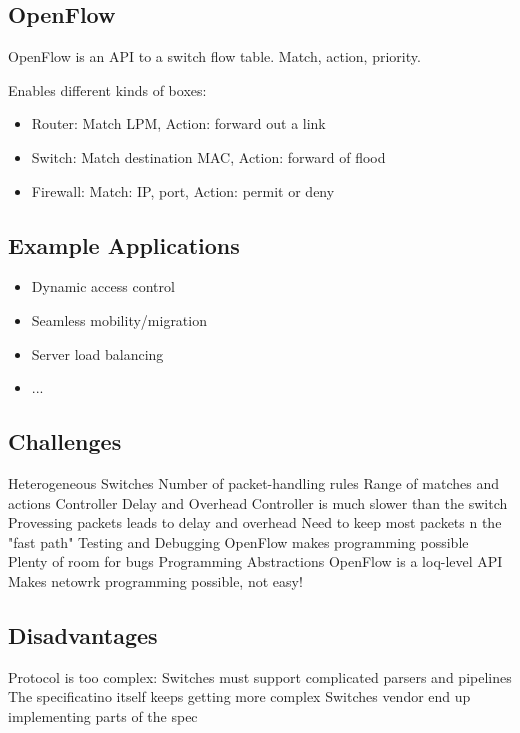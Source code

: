 \documentclass[a4paper, fontsize=8pt, landscape, DIV=1]{scrartcl}
\begin{document}
\begin{multicols*}{4}
  \section{OpenFlow}
  OpenFlow is an API to a switch flow table. Match, action, priority.

  Enables different kinds of boxes:
  \begin{itemize}
    \item Router: Match LPM, Action: forward out a link
    \item Switch: Match destination MAC, Action: forward of flood
    \item Firewall: Match: IP, port, Action: permit or deny
  \end{itemize}

  \subsection{Example Applications}
  \begin{itemize}
    \item Dynamic access control
    \item Seamless mobility/migration
    \item Server load balancing
    \item ...
  \end{itemize}

  \subsection{Challenges}
  \begin{outline}
    \1 Heterogeneous Switches
      \2 Number of packet-handling rules
      \2 Range of matches and actions
    \1 Controller Delay and Overhead
      \2 Controller is much slower than the switch
      \2 Provessing packets leads to delay and overhead
      \2 Need to keep most packets n the "fast path"
    \1 Testing and Debugging
      \2 OpenFlow makes programming possible
      \2 Plenty of room for bugs
    \1 Programming Abstractions
      \2 OpenFlow is a loq-level API
      \2 Makes netowrk programming possible, not easy!
  \end{outline}

  \subsection{Disadvantages}
  \begin{outline}
    \1 Protocol is too complex:
    Switches must support complicated parsers and pipelines
    \1 The specificatino itself keeps getting more complex
    \1 Switches vendor end up implementing parts of the spec
  \end{outline}


\end{multicols*}
\end{document}
